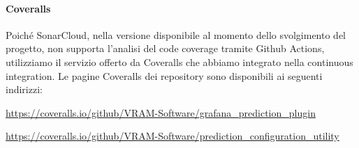 	\paragraph{Coveralls}
	Poiché SonarCloud, nella versione disponibile al momento dello svolgimento del progetto\glo, non supporta l'analisi del code coverage tramite Github Actions, utilizziamo il servizio offerto da Coveralls che abbiamo integrato nella continuous integration. Le pagine Coveralls dei repository sono disponibili ai seguenti indirizzi:
	\begin{center}
		\url{https://coveralls.io/github/VRAM-Software/grafana_prediction_plugin}
	\end{center}
	\begin{center}
	\url{https://coveralls.io/github/VRAM-Software/prediction_configuration_utility}
	\end{center}
	
		